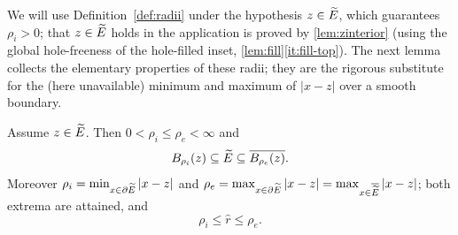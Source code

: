 We will use Definition~\ref{def:radii} under the hypothesis $z\in\widetilde{E}$,
which guarantees $\rho_i>0$; that $z\in\widetilde{E}$ holds in the application is
proved by \cref{lem:zinterior} \textup{(}using the global hole-freeness of
the hole-filled inset, \cref{lem:fill}\ref{it:fill-top}\textup{)}. The next
lemma collects the
elementary properties of these radii; they are the rigorous substitute for
the (here unavailable) minimum and maximum of $|x-z|$ over a smooth boundary.

\begin{lemma}\label{lem:radii}
Assume $z\in\widetilde{E}$. Then $0<\rho_i\le\rho_e<\infty$ and
\begin{equation}\label{eq:inclusions}
   B_{\rho_i}(z)\subseteq\widetilde{E}\subseteq \overline{B_{\rho_e}(z)} .
\end{equation}
Moreover $\rho_i=\min_{x\in\partial\widetilde{E}}|x-z|$ and
$\rho_e=\max_{x\in\partial\widetilde{E}}|x-z|=\max_{x\in\overline{\widetilde{E}}}|x-z|$; both
extrema are attained, and
\begin{equation}\label{eq:rhat-between}
   \rho_i\le\hat r\le\rho_e .
\end{equation}
\end{lemma}

